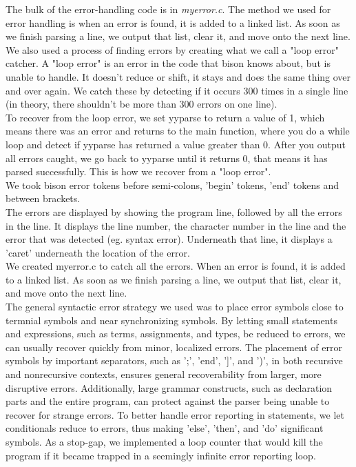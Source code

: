 \documentclass{report}
\begin{document}
The bulk of the error-handling code is in \emph{myerror.c}. The method we used for error handling is when an error is found, it is added to a linked list. As soon as we finish parsing a line, we output that list, clear it, and move onto the next line. \\
We also used a process of finding errors by creating what we call a "loop error" catcher. A "loop error" is an error in the code that bison knows about, but is unable to handle. It doesn't reduce or shift, it stays and does the same thing over and over again. We catch these by detecting if it occurs 300 times in a single line (in theory, there shouldn't be more than 300 errors on one line). \\
To recover from the loop error, we set yyparse to return a value of 1, which means there was an error and returns to the main function, where you do a while loop and detect if yyparse has returned a value greater than 0. After you output all errors caught, we go back to yyparse until it returns 0, that means it has parsed successfully. This is how we recover from a "loop error".\\
We took bison error tokens before semi-colons, 'begin' tokens, 'end' tokens and between brackets.\\
The errors are displayed by showing the program line, followed by all the errors in the line. It displays the line number, the character number in the line and the error that was detected (eg. syntax error). Underneath that line, it displays a 'caret' underneath the location of the error.\\
We created myerror.c to catch all the errors. When an error is found, it is added to a linked list. As soon as we finish parsing a line, we output that list, clear it, and move onto the next line.\\

The general syntactic error strategy we used was to place error symbols close to termnial symbols and near synchronizing symbols. 
By letting small statements and expressions, such as terms, assignments, and types, be reduced to errors, we can usually recover quickly from minor, localized errors. 
The placement of error symbols by important separators, such as ';', 'end', ']', and ')', in both recursive and nonrecursive contexts, ensures general recoverability from larger, more disruptive errors.
Additionally, large grammar constructs, such as declaration parts and the entire program, can protect against the parser being unable to recover for strange errors. 
To better handle error reporting in statements, we let conditionals reduce to errors, thus making 'else', 'then', and 'do' significant symbols. As a stop-gap, we implemented a loop counter that would kill the program if it became trapped in a seemingly infinite error reporting loop.
\\
\end{document}
